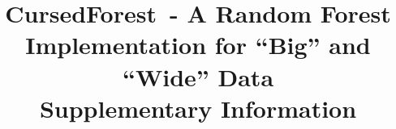 \usepackage{graphicx}
\usepackage{gensymb}
\usepackage{nag}   %
\usepackage{fixltx2e}
\usepackage{booktabs}
\usepackage{microtype}  %
\usepackage{fancyvrb}   %
\usepackage{numprint} %

\parindent=0pt
\parskip=8pt
\setlength\itemsep{0em}

\renewcommand{\textfraction}{0.0}

\let\oldmarginpar\marginpar
\renewcommand\marginpar[1]{\-\oldmarginpar[\raggedleft\footnotesize #1]%
{\raggedright\footnotesize #1}}

\newcommand{\supp}{\mathop{\mathrm{supp}}}

\newcommand{\cursedforest}{{\sc CursedForest}}
\newcommand{\mtry}{{\texttt mtry}}
\newcommand{\ntree}{{\texttt ntree}}


\newsavebox\ltmcbox

\title{\cursedforest\ - A Random Forest Implementation for ``Big'' and ``Wide'' Data \\
Supplementary Information}
\author{}
\date{}




\maketitle


